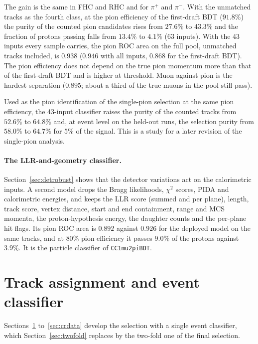 \documentclass[11pt,a4paper]{article}
\begin{document}
The gain is the same in FHC and RHC and for $\pi^+$ and $\pi^-$. With the unmatched tracks as the
fourth class, at the pion efficiency of the first-draft BDT ($91.8\%$) the purity of the counted pion
candidates rises from $27.6\%$ to $43.3\%$ and the fraction of protons passing falls from $13.4\%$ to
$4.1\%$ (63 inputs). With the 43 inputs every sample carries, the pion ROC area on the full pool,
unmatched tracks included, is $0.938$ ($0.946$ with all inputs, $0.868$ for the first-draft BDT). The
pion efficiency does not depend on the true pion momentum more than that of the first-draft BDT and is
higher at threshold. Muon against pion is the hardest separation ($0.895$; about a third of the true
muons in the pool still pass).

Used as the pion identification of the single-pion selection at the same pion efficiency, the
43-input classifier raises the purity of the counted tracks from $52.6\%$ to $64.8\%$ and, at event level on the
held-out runs, the selection purity from $58.0\%$ to $64.7\%$ for $5\%$ of the signal. This is a study
for a later revision of the single-pion analysis.

\paragraph{The LLR-and-geometry classifier.} Section~\ref{sec:detrobust} shows that the detector
variations act on the calorimetric inputs. A second model drops the Bragg likelihoods, $\chi^2$
scores, PIDA and calorimetric energies, and keeps the LLR score (summed and per plane), length, track
score, vertex distance, start and end containment, range and MCS momenta, the proton-hypothesis energy,
the daughter counts and the per-plane hit flags. Its pion ROC area is $0.892$ against $0.926$ for the
deployed model on the same tracks, and at $80\%$ pion efficiency it passes $9.0\%$ of the protons
against $3.9\%$. It is the particle classifier of \texttt{CC1mu2piBDT}.

\section{Track assignment and event classifier}
\label{sec:event}

Sections~\ref{sec:event} to~\ref{sec:crdata} develop the selection with a single event classifier, which
Section~\ref{sec:twofold} replaces by the two-fold one of the final selection.
\end{document}
